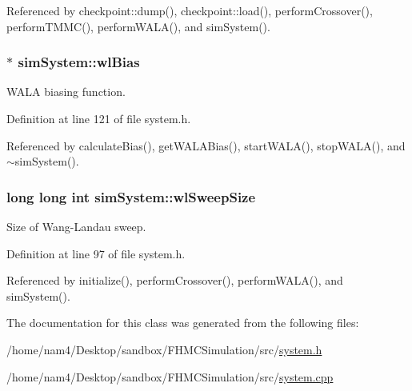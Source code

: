 Referenced by checkpoint\-::dump(), checkpoint\-::load(), perform\-Crossover(), perform\-T\-M\-M\-C(), perform\-W\-A\-L\-A(), and sim\-System().

\hypertarget{classsim_system_a6dc8d9f89dfcfa247a59bc50889c49e7}{
\subsubsection[{wl\-Bias}]{$\ast$ sim\-System\-::wl\-Bias}}\label{classsim_system_a6dc8d9f89dfcfa247a59bc50889c49e7}


W\-A\-L\-A biasing function. 



Definition at line 121 of file system.\-h.



Referenced by calculate\-Bias(), get\-W\-A\-L\-A\-Bias(), start\-W\-A\-L\-A(), stop\-W\-A\-L\-A(), and $\sim$sim\-System().

\hypertarget{classsim_system_ae625e1026daee4f99f83fb73881875a1}{
\subsubsection[{wl\-Sweep\-Size}]{\setlength{\rightskip}{0pt plus 5cm}long long int sim\-System\-::wl\-Sweep\-Size}}\label{classsim_system_ae625e1026daee4f99f83fb73881875a1}


Size of Wang-\/\-Landau sweep. 



Definition at line 97 of file system.\-h.



Referenced by initialize(), perform\-Crossover(), perform\-W\-A\-L\-A(), and sim\-System().



The documentation for this class was generated from the following files\-:\begin{DoxyCompactItemize}
\item 
/home/nam4/\-Desktop/sandbox/\-F\-H\-M\-C\-Simulation/src/\hyperlink{system_8h}{system.\-h}\item 
/home/nam4/\-Desktop/sandbox/\-F\-H\-M\-C\-Simulation/src/\hyperlink{system_8cpp}{system.\-cpp}\end{DoxyCompactItemize}
